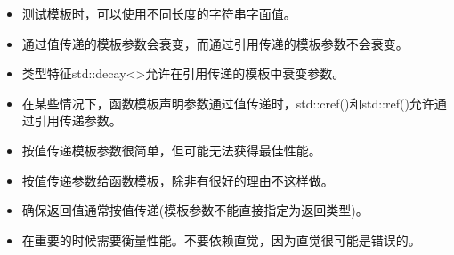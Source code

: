 
\begin{itemize}
\item 
测试模板时，可以使用不同长度的字符串字面值。

\item 
通过值传递的模板参数会衰变，而通过引用传递的模板参数不会衰变。

\item 
类型特征std::decay<>允许在引用传递的模板中衰变参数。

\item 
在某些情况下，函数模板声明参数通过值传递时，std::cref()和std::ref()允许通过引用传递参数。

\item 
按值传递模板参数很简单，但可能无法获得最佳性能。

\item 
按值传递参数给函数模板，除非有很好的理由不这样做。

\item 
确保返回值通常按值传递(模板参数不能直接指定为返回类型)。

\item 
在重要的时候需要衡量性能。不要依赖直觉，因为直觉很可能是错误的。
\end{itemize}